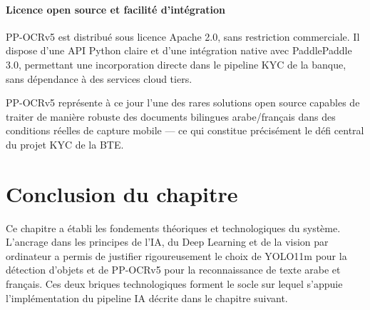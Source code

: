 \paragraph{Licence open source et facilité d'intégration}

PP-OCRv5 est distribué sous licence Apache 2.0, sans restriction commerciale. Il dispose d'une API Python claire et d'une intégration native avec PaddlePaddle 3.0, permettant une incorporation directe dans le pipeline KYC de la banque, sans dépendance à des services cloud tiers.

\vspace{0.5cm}

PP-OCRv5 représente à ce jour l'une des rares solutions open source capables de traiter de manière robuste des documents bilingues arabe/français dans des conditions réelles de capture mobile --- ce qui constitue précisément le défi central du projet KYC de la BTE.


\section*{Conclusion du chapitre}

Ce chapitre a établi les fondements théoriques et technologiques du système. L'ancrage dans les principes de l'IA, du Deep Learning et de la vision par ordinateur a permis de justifier rigoureusement le choix de YOLO11m pour la détection d'objets et de PP-OCRv5 pour la reconnaissance de texte arabe et français. Ces deux briques technologiques forment le socle sur lequel s'appuie l'implémentation du pipeline IA décrite dans le chapitre suivant.

